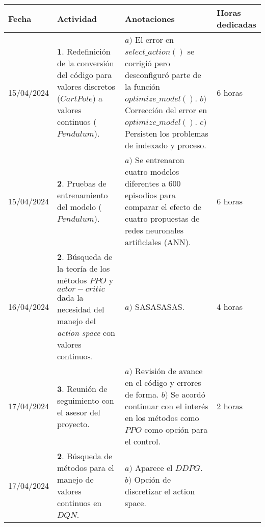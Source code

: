 \documentclass[12pt]{article}
\begin{document}
\begin{minipage}[h]{\textwidth}
	\centering
	\begin{tabularx}{\textwidth}{|p{2cm}|X|X|p{2cm}|} 
		\hline
		\rowcolor{encabezado}
		\textbf{Fecha} & 
		\textbf{Actividad} & 
		\textbf{Anotaciones} & 
		\textbf{Horas dedicadas} \\ \hline
	 	15/04/2024 & 
	 	$\mathbf{1}.$ Redefinición de la conversión del código para valores discretos ($CartPole$) a valores continuos ($Pendulum$). & 
	 	$a)$ El error en $select\_ action()$ se corrigió pero desconfiguró parte de la función $optimize\_ model()$. \newline
	 	$b)$ Corrección del error en $optimize\_ model()$. \newline
	 	$c)$ Persisten los problemas de indexado y proceso. \newline & 
	 	6 horas \\
	 	15/04/2024 & 
	 	$\mathbf{2}.$ Pruebas de entrenamiento del modelo ($Pendulum$). & 
	 	$a)$ Se entrenaron cuatro modelos diferentes a $600$ episodios para comparar el efecto de cuatro propuestas de redes neuronales artificiales (ANN). \newline & 
	 	6 horas \\
		16/04/2024 & 
	 	$\mathbf{2}.$ Búsqueda de la teoría de los métodos $PPO$ y $actor-critic$ dada la necesidad del manejo del \textit{action space} con valores continuos. &
	 	$a)$ SASASASAS. \newline & 
	 	4 horas \\
	 	17/04/2024 & 
	 	$\mathbf{3}.$ Reunión de seguimiento con el asesor del proyecto. & 
	 	$a)$ Revisión de avance en el código y errores de forma.  \newline
	 	$b)$ Se acordó continuar con el interés en los métodos como $PPO$ como opción para el control.  \newline & 
	 	2 horas \\
		17/04/2024 & 
	 	$\mathbf{2}.$ Búsqueda de métodos para el manejo de valores continuos en $DQN$. &
	 	$a)$ Aparece el $DDPG$. \newline
	 	$b)$ Opción de discretizar el action space. \newline & 

\end{tabularx}
\end{minipage}
\end{document}
